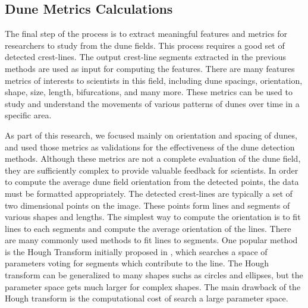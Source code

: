 \subsection{Dune Metrics Calculations} \label{subsec:dune_field_metrics}
The final step of the process is to extract meaningful features and metrics for researchers to study from the dune fields. This process requires a good set of detected crest-lines. The output crest-line segments extracted in the previous methods are used as input for computing the features. There are many features metrics of interests to scientists in this field, including dune spacings, orientation, shape, size, length, bifurcations, and many more. These metrics can be used to study and understand the movements of various patterns of dunes over time in a specific area.

As part of this research, we focused mainly on orientation and spacing of dunes, and used those metrics as validations for the effectiveness of the dune detection methods. Although these metrics are not a complete evaluation of the dune field, they are sufficiently complex to provide valuable feedback for scientists. In order to compute the average dune field orientation from the detected points, the data must be formatted appropriately. The detected crest-lines are typically a set of two dimensional points on the image. These points form lines and segments of various shapes and lengths. The simplest way to compute the orientation is to fit lines to each segments and compute the average orientation of the lines. There are many commonly used methods to fit lines to segments. One popular method is the Hough Transform initially proposed in \cite{hough-1959-paper,hough-1962-patent,hough-duda-1972-paper}, which searches a space of parameters voting for segments which contribute to the line. The Hough transform can be generalized to many shapes suchs as circles and ellipses, but the parameter space gets much larger for complex shapes. The main drawback of the Hough transform is the computational cost of search a large parameter space.

